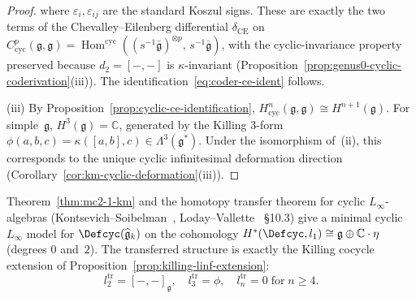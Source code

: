 \begin{proof}
where $\varepsilon_i, \varepsilon_{ij}$ are the standard Koszul signs.
These are exactly the two terms of the Chevalley--Eilenberg differential
$\delta_{\mathrm{CE}}$ on
$C^p_{\mathrm{cyc}}(\mathfrak{g},\mathfrak{g})
= \operatorname{Hom}^{\mathrm{cyc}}
((s^{-1}\bar{\mathfrak{g}})^{\otimes p},\,
s^{-1}\bar{\mathfrak{g}})$,
with the cyclic-invariance property preserved because $d_2 = [-,-]$
is $\kappa$-invariant (Proposition~\ref{prop:genus0-cyclic-coderivation}(iii)).
The identification~\eqref{eq:coder-ce-ident} follows.

(iii)\enspace
By Proposition~\ref{prop:cyclic-ce-identification},
$H^n_{\mathrm{cyc}}(\mathfrak{g},\mathfrak{g})
\cong H^{n+1}(\mathfrak{g})$.
For simple~$\mathfrak{g}$, $H^3(\mathfrak{g}) = \mathbb{C}$,
generated by the Killing $3$-form
$\phi(a,b,c) = \kappa([a,b],c) \in \Lambda^3(\mathfrak{g}^*)$.
Under the isomorphism of~(ii), this corresponds to the
unique cyclic infinitesimal deformation direction
(Corollary~\ref{cor:km-cyclic-deformation}(iii)).
\end{proof}

\begin{corollary}\label{cor:km-minimal-linf}
Theorem~\textup{\ref{thm:mc2-1-km}} and the homotopy transfer
theorem for cyclic $L_\infty$-algebras
\textup{(}Kontsevich--Soibelman~\textup{\cite{KontsevichSoibelman}},
Loday--Vallette~\textup{\cite{LV12}} \S10.3\textup{)}
give a minimal cyclic $L_\infty$ model for
$\Defcyc(\widehat{\mathfrak{g}}_k)$ on the cohomology
$H^*(\Defcyc, l_1) \cong \mathfrak{g} \oplus \mathbb{C}\cdot\eta$
\textup{(}degrees $0$ and~$2$\textup{)}.
The transferred structure is exactly
the Killing cocycle extension of
Proposition~\textup{\ref{prop:killing-linf-extension}}:
\begin{equation}\label{eq:km-minimal-linf-structure}
l_2^{\mathrm{tr}} = [-,-]_{\mathfrak{g}},\quad
l_3^{\mathrm{tr}} = \phi,\quad
l_n^{\mathrm{tr}} = 0 \;\text{for}\; n \geq 4.
\end{equation}
\end{corollary}

